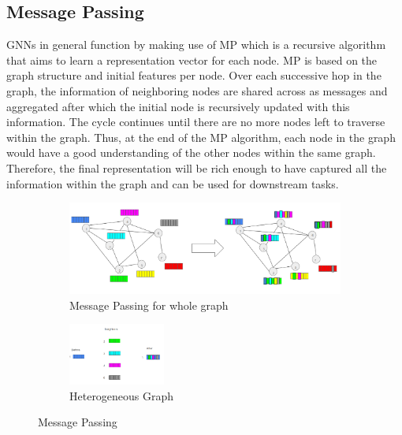 \documentclass{report} %
\begin{document}
\subsection{Message Passing}\label{subsec:MP}

\ac{GNN}s in general function by making use of \ac{MP} which is a recursive algorithm that aims to learn a representation vector for each node. 
\ac{MP} is based on the graph structure and initial features per node. Over each successive hop in the graph, the information of neighboring nodes are 
shared across as messages and aggregated after which the initial node is recursively updated with this information. The cycle continues until there are no more nodes 
left to traverse within the graph. Thus, at the end of the \ac{MP} algorithm, each node in the graph would have a good understanding of the other nodes within the same 
graph. Therefore, the final representation will be rich enough to have captured all the information within the graph and can be used for downstream tasks.\\

\begin{figure}[H]
    \centering
    \begin{subfigure}{\textwidth}
        \centering
        \includegraphics[width=.9\textwidth]{./ReportImages/HomogeneousMP.png} 
        \caption{Message Passing for whole graph} 
        \label{fig:Message Passing for whole graph}
    \end{subfigure}\vfill
    \begin{subfigure}{\textwidth}
        \centering
        \includegraphics[width=0.35\textwidth]{./ReportImages/HomogeneousMP1Node.png}
        \caption{Heterogeneous Graph}
        \label{fig:Message Passing for 1 Node}
    \end{subfigure}
    \caption{Message Passing}
    \label{fig:Message Passing}
\end{figure}
\end{document}
